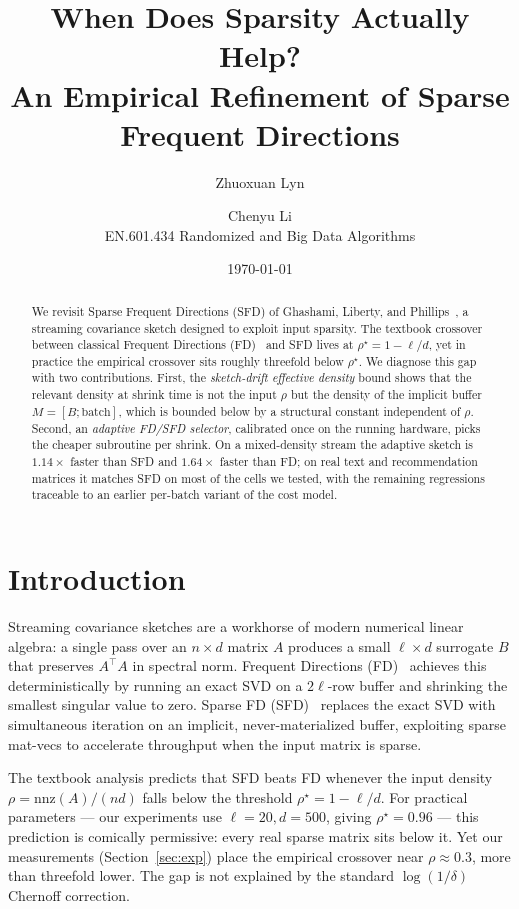 \documentclass[11pt]{article}
\title{When Does Sparsity Actually Help?\\
\large An Empirical Refinement of Sparse Frequent Directions}
\author{Zhuoxuan Lyn \and Chenyu Li\\
\small EN.601.434 Randomized and Big Data Algorithms}
\date{\today}
\begin{document}
\maketitle

\begin{abstract}
We revisit Sparse Frequent Directions (SFD) of Ghashami, Liberty, and
Phillips~\cite{ghashami2016sfd}, a streaming covariance sketch designed to
exploit input sparsity. The textbook crossover between classical Frequent
Directions (FD)~\cite{liberty2013fd} and SFD lives at $\rho^\star = 1 - \ell/d$,
yet in practice the empirical crossover sits roughly threefold below
$\rho^\star$. We diagnose this gap with two contributions. First, the
\emph{sketch-drift effective density} bound shows that the relevant density at
shrink time is not the input $\rho$ but the density of the implicit buffer
$M = [B; \mathrm{batch}]$, which is bounded below by a structural constant
independent of $\rho$. Second, an \emph{adaptive FD/SFD selector}, calibrated
once on the running hardware, picks the cheaper subroutine per shrink. On a
mixed-density stream the adaptive sketch is $1.14\times$ faster than SFD and
$1.64\times$ faster than FD; on real text and recommendation matrices it
matches SFD on most of the cells we tested, with the remaining regressions
traceable to an earlier per-batch variant of the cost model.
\end{abstract}

\section{Introduction}
\label{sec:intro}

Streaming covariance sketches are a workhorse of modern numerical linear
algebra: a single pass over an $n \times d$ matrix $A$ produces a small
$\ell \times d$ surrogate $B$ that preserves $A^\top A$ in spectral norm.
Frequent Directions (FD)~\cite{liberty2013fd} achieves this deterministically
by running an exact SVD on a $2\ell$-row buffer and shrinking the smallest
singular value to zero. Sparse FD (SFD)~\cite{ghashami2016sfd} replaces the
exact SVD with simultaneous iteration on an implicit, never-materialized
buffer, exploiting sparse mat-vecs to accelerate throughput when the input
matrix is sparse.

The textbook analysis predicts that SFD beats FD whenever the input density
$\rho = \mathrm{nnz}(A)/(nd)$ falls below the threshold
$\rho^\star = 1 - \ell/d$. For practical parameters --- our experiments use
$\ell = 20, d = 500$, giving $\rho^\star = 0.96$ --- this prediction is
comically permissive: every real sparse matrix sits below it. Yet our
measurements (Section~\ref{sec:exp}) place the empirical crossover near
$\rho \approx 0.3$, more than threefold lower. The gap is not explained
by the standard $\log(1/\delta)$ Chernoff correction.
\end{document}

